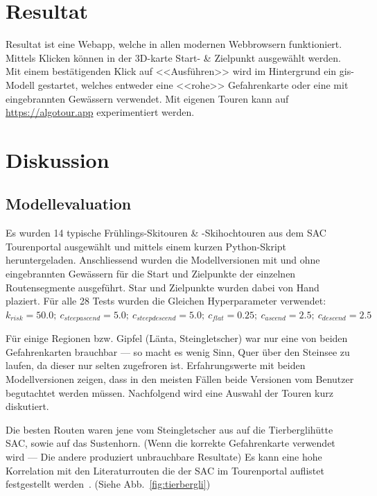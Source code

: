\section{Resultat}

Resultat ist eine Webapp, welche in allen modernen Webbrowsern funktioniert. Mittels Klicken können in der 3D-karte Start- \& Zielpunkt ausgewählt werden. Mit einem bestätigenden Klick auf <<Ausführen>> wird im Hintergrund ein \gls{gis}-Modell gestartet, welches entweder eine <<rohe>> Gefahrenkarte oder eine mit eingebrannten Gewässern verwendet. Mit eigenen Touren kann auf \url{https://algotour.app} experimentiert werden.


\clearpage
\section{Diskussion}

\subsection{Modellevaluation}

Es wurden 14 typische Frühlings-Skitouren \& -Skihochtouren aus dem SAC Tourenportal ausgewählt und mittels einem kurzen Python-Skript heruntergeladen. Anschliessend wurden die Modellversionen mit und ohne eingebrannten Gewässern für die Start und Zielpunkte der einzelnen Routensegmente ausgeführt. Star und Zielpunkte wurden dabei von Hand plaziert. Für alle 28 Tests wurden die Gleichen Hyperparameter verwendet: $k_{risk}={50.0};\ c_{steepascend}={5.0};\ c_{steepdescend}={5.0};\ c_{flat}={0.25};\ c_{ascend}={2.5};\ c_{descend}={2.5}$

Für einige Regionen bzw. Gipfel (Länta, Steingletscher) war nur eine von beiden Gefahrenkarten brauchbar --- so macht es wenig Sinn, Quer über den Steinsee zu laufen, da dieser nur selten zugefroren ist. Erfahrungswerte mit beiden Modellversionen zeigen, dass in den meisten Fällen beide Versionen vom Benutzer begutachtet werden müssen.
Nachfolgend wird eine Auswahl der Touren kurz diskutiert.

Die besten Routen waren jene vom Steingletscher aus auf die Tierberglihütte SAC, sowie auf das Sustenhorn. (Wenn die korrekte Gefahrenkarte verwendet wird --- Die andere produziert unbrauchbare Resultate) Es kann eine hohe Korrelation mit den Literaturrouten die der SAC im Tourenportal auflistet festgestellt werden~\cite{mmzentralch}. (Siehe Abb.\ \ref{fig:tierbergli})

